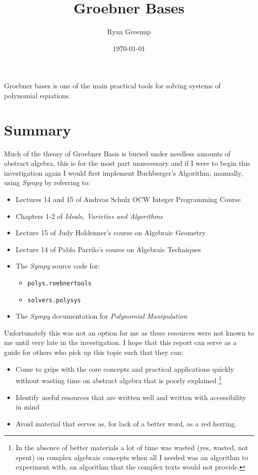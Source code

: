 \documentclass[a4paper,11pt,twoside]{article}
\author{Ryan Greenup}
\date{\today}
\title{Groebner Bases}
\begin{document}
\maketitle

Groebner bases is one of the main practical tools for solving systems
of polynomial equations.

\section{Summary}
\label{sec:org73c5bea}
Much of the theory of Groebner Basis is buried under needless
amounts of abstract algebra, this is for the most part unnecessary
and if I were to begin this investigation again I would first
implement Buchberger's Algorithm, manually, using \emph{Sympy} by referring to:

\begin{itemize}
\item Lectures 14 and 15 of Andreas Schulz OCW Integer Programming
Course \cite{andreasschulzIntegerProgrammingCombinatorial}
\item Chapters 1-2 of \emph{Ideals, Varieties and Algorithms} \cite{coxIdealsVarietiesAlgorithms1997}
\item Lecture 15 of Judy Holdenner's course on Algebraic Geometry \cite{judyholdenerAlgebraicGeometry2013}
\item Lecture 14 of Pablo Parrilo's course on Algebraic Techniques \cite{pabloparriloAlgebraicTechniquesSemidefinite}
\item The \emph{Sympy} source code for:
\begin{itemize}
\item \texttt{polys.roebnertools} \cite{sympydevelopmentteamSympyPolysGroebnertools}
\item \texttt{solvers.polysys} \cite{sympydevelopmentteamSympySolversPolysys}
\end{itemize}
\item The \emph{Sympy} documentation for \emph{Polynomial Manipulation} \cite{sympydevelopmentteamGrobnerBasesTheir2021}
\end{itemize}

Unfortunately this was not an option for me as these resources were
not known to me until very late in the investigation. I hope that
this report can serve as a guide for others who pick up this topic
such that they can:

\begin{itemize}
\item Come to grips with the core concepts and practical applications
quickly without wasting time on abstract algebra that is poorly
explained \footnote{In the absence of better materials a lot of time was wasted
(yes, wasted, not spent) on complex algebraic concepts when all I
needed was an algorithm to experiment with, an algorithm that the
complex texts would not provide.}
\item Identify useful resources that are written well and written with
accessibility in mind
\item Avoid material that serves as, for lack of a better word, as a
red herring.
\end{itemize}
\end{document}
